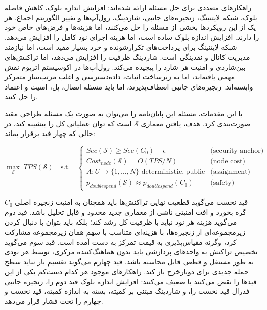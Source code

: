 راهکارهای متعددی برای حل مسئله ارائه شده‌اند: افزایش اندازه بلوک، کاهش فاصله بلوک، شبکه لایتنینگ، زنجیره‌های جانبی، شاردینگ، رول‌آپ‌ها و تغییر الگوریتم اجماع. هر یک از این رویکردها بخشی از مسئله را حل می‌کنند، اما هزینه‌ها و فرض‌های خاص خود را دارند. افزایش اندازه بلوک ساده است، اما هزینه اجرای نود کامل را افزایش می‌دهد. شبکه لایتنینگ برای پرداخت‌های تکرارشونده و خرد بسیار مفید است، اما نیازمند مدیریت کانال و نقدینگی است. شاردینگ ظرفیت را افزایش می‌دهد، اما تراکنش‌های بین‌شاردی و امنیت هر شارد را پیچیده می‌کند. رول‌آپ‌ها در اکوسیستم اتریوم نقش مهمی یافته‌اند، اما به زیرساخت اثبات، داده‌دسترسی و اغلب مرتب‌ساز متمرکز وابسته‌اند. زنجیره‌های جانبی انعطاف‌پذیرند، اما باید مسئله اتصال، پل، امنیت و اعتماد را حل کنند.

با این مقدمات، مسئله این پایان‌نامه را می‌توان به صورت یک مسئله طراحی مقید صورت‌بندی کرد. هدف، یافتن معماری \(\mathcal{S}\) است که توان عملیاتی کل را بیشینه کند، در حالی که چهار قید برقرار بماند:

\begin{latin}
\[
\max_{\mathcal{S}} \; TPS(\mathcal{S}) \quad \text{s.t.} \quad
\begin{cases}
Sec(\mathcal{S}) \geq Sec(C_0) - \epsilon & \text{(security anchor)}\\
Cost_{node}(\mathcal{S}) = O(TPS/N) & \text{(node cost)}\\
A: U \rightarrow \{1,\dots,N\} \text{ deterministic, public} & \text{(assignment)}\\
p_{doublespend}(\mathcal{S}) \approx p_{doublespend}(C_0) & \text{(safety)}
\end{cases}
\]
\end{latin}

قید نخست می‌گوید قطعیت نهایی تراکنش‌ها باید همچنان به امنیت زنجیره اصلی \(C_0\) گره بخورد و افت امنیتی ناشی از معماری جدید محدود و قابل تحلیل باشد. قید دوم می‌گوید هزینه هر نود نباید با ظرفیت کل رشد کند؛ بلکه باید بتوان با دنبال کردن زیرمجموعه‌ای از زنجیره‌ها، با هزینه‌ای متناسب با سهم همان زیرمجموعه مشارکت کرد، وگرنه مقیاس‌پذیری به قیمت تمرکز به دست آمده است. قید سوم می‌گوید تخصیص تراکنش به واحدهای پردازشی باید بدون هماهنگ‌کننده مرکزی، توسط هر نودی به طور مستقل و قطعی قابل محاسبه باشد. قید چهارم می‌گوید تقسیم بار نباید سطح حمله جدیدی برای دوبارخرج باز کند. راهکارهای موجود هر کدام دست‌کم یکی از این قیدها را نقض می‌کنند یا ضعیف می‌کنند: افزایش اندازه بلوک قید دوم را، زنجیره جانبی فدرال قید نخست را، و شاردینگ مبتنی بر کمیته، بسته به اندازه کمیته، قید نخست و چهارم را تحت فشار قرار می‌دهد.

